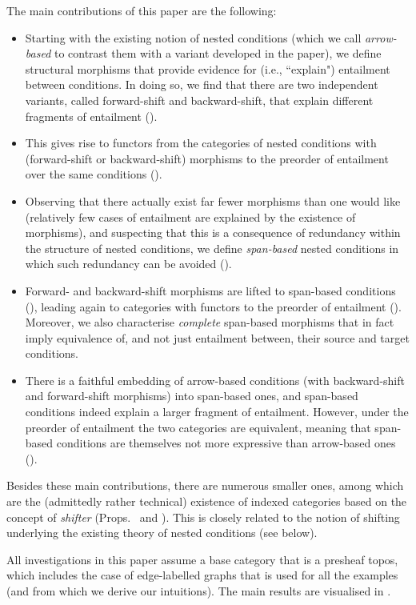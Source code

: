 The main contributions of this paper are the following:

\begin{itemize}
\item Starting with the existing notion of nested conditions (which we call \emph{arrow-based} to contrast them with a variant developed in the paper), we define structural morphisms that provide evidence for (i.e., ``explain") entailment between conditions. In doing so, we find that there are two independent variants, called forward-shift and backward-shift, that explain different fragments of entailment ().

\item This gives rise to functors from the categories of nested conditions with (forward-shift or backward-shift) morphisms to the preorder of entailment over the same conditions ().

\item Observing that there actually exist far fewer morphisms than one would like (relatively few cases of entailment are explained by the existence of morphisms), and suspecting that this is a consequence of redundancy within the structure of nested conditions, we define \emph{span-based} nested conditions in which such redundancy can be avoided ().

\item Forward- and backward-shift morphisms are lifted to span-based conditions (), leading again to categories with functors to the preorder of entailment (). Moreover, we also characterise \emph{complete} span-based morphisms that in fact imply equivalence of, and not just entailment between, their source and target conditions.

\item There is a faithful embedding of arrow-based conditions (with backward-shift and forward-shift morphisms) into span-based ones, and span-based conditions indeed explain a larger fragment of entailment. However, under the preorder of entailment the two categories are equivalent, meaning that span-based conditions are themselves not more expressive than arrow-based ones ().
\end{itemize}
%
Besides these main contributions, there are numerous smaller ones, among which are the (admittedly rather technical) existence of indexed categories based on the concept of \emph{shifter} (Props.\  and ). This is closely related to the notion of shifting underlying the existing theory of nested conditions (see below).

All investigations in this paper assume a base category that is a presheaf topos, which includes the case of edge-labelled graphs that is used for all the examples (and from which we derive our intuitions). The main results are visualised in .
